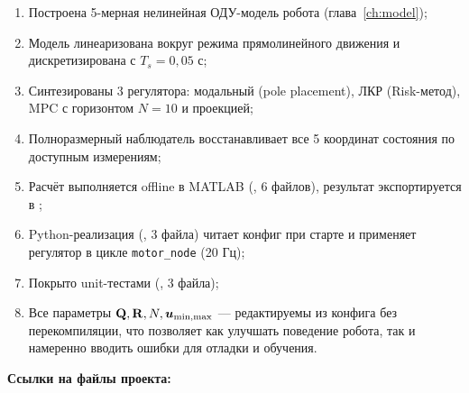 \begin{enumerate}
  \item Построена 5-мерная нелинейная ОДУ-модель робота
        (глава~\ref{ch:model});
  \item Модель линеаризована вокруг режима прямолинейного движения
        и дискретизирована с $T_s = 0{,}05$ с;
  \item Синтезированы 3 регулятора: модальный (pole placement),
        ЛКР (Risk-метод), MPC с горизонтом $N = 10$ и проекцией;
  \item Полноразмерный наблюдатель восстанавливает все 5 координат
        состояния по доступным измерениям;
  \item Расчёт выполняется offline в MATLAB
        (, 6 файлов), результат экспортируется в
        ;
  \item Python-реализация (, 3 файла)
        читает конфиг при старте и применяет регулятор в цикле
        \texttt{motor\_node} (20 Гц);
  \item Покрыто unit-тестами (, 3 файла);
  \item Все параметры $\mathbf{Q}, \mathbf{R}, N, \bm{u}_{\min,\max}$ ---
        редактируемы из конфига без перекомпиляции, что позволяет как
        улучшать поведение робота, так и намеренно вводить ошибки
        для отладки и обучения.
\end{enumerate}

\textbf{Ссылки на файлы проекта:}

